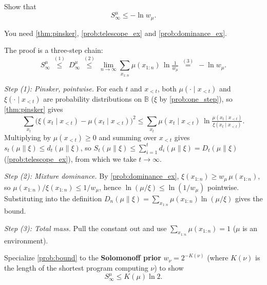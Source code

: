 \documentclass[fontsize=11pt, parskip=half]{scrartcl}
\begin{document}
\begin{exercise}
\label{prob:bound_ex}



Show that
\[
S_{\infty}^{\mu} \leq - \ln w_\mu.
\]

\begin{hint}
You need \cref{thm:pinsker}, \cref{prob:telescope_ex} and \cref{prob:dominance_ex}.
\end{hint}
\end{exercise}

\begin{solution}
The proof is a three-step chain:
\[
  S^\mu_\infty
  ~\stackrel{(1)}{\leq}~
   D^\mu_\infty
  ~\stackrel{(2)}{\leq}~
  \lim_{n \to \infty} \sum_{x_{1:n}} \mu(x_{1:n}) \,\ln \tfrac{1}{w_\mu}
  ~\stackrel{(3)}{=}~
  -\ln w_\mu.
\]

\medskip
\textit{Step (1): Pinsker, pointwise.}
For each $t$ and $x_{<t}$, both $\mu(\cdot \mid x_{<t})$ and $\xi(\cdot \mid x_{<t})$ are probability distributions on $\mathbb{B}$ ($\xi$ by \cref{prob:one_step}), so \cref{thm:pinsker} gives
\[
\sum_{x_t} \bigl(\xi(x_t \mid x_{<t}) - \mu(x_t \mid x_{<t})\bigr)^2 \leq \sum_{x_t} \mu(x_t \mid x_{<t}) \,\ln \tfrac{\mu(x_t \mid x_{<t})}{\xi(x_t \mid x_{<t})}.
\]
Multiplying by $\mu(x_{<t}) \geq 0$ and summing over $x_{<t}$ gives 
$s_t(\mu \parallel \xi) \leq d_t(\mu \parallel \xi)$, so $S_t(\mu \parallel \xi) \leq \sum_{i=1}^t d_i(\mu \parallel \xi) = D_t(\mu \parallel \xi)$ (\cref{prob:telescope_ex}), 
from which we take $t \to \infty$.


\medskip
\textit{Step (2): Mixture dominance.}
By \cref{prob:dominance_ex}, $\xi(x_{1:n}) \geq w_\mu\, \mu(x_{1:n})$, so $\mu(x_{1:n}) / \xi(x_{1:n}) \leq 1/w_\mu$, hence $\ln(\mu/\xi) \leq \ln(1/w_\mu)$ pointwise. Substituting into the definition $D_n(\mu \parallel \xi) = \sum_{x_{1:n}} \mu(x_{1:n}) \ln(\mu/\xi)$ gives the bound.

\medskip
\textit{Step (3): Total mass.}
Pull the constant out and use $\sum_{x_{1:n}} \mu(x_{1:n}) = 1$ ($\mu$ is an environment). \qedhere
\end{solution}


\begin{exercise}
\label{prob:bound_explicit_ex}



Specialize \cref{prob:bound} to the \textbf{Solomonoff prior} $w_\nu = 2^{-K(\nu)}$ (where $K(\nu)$ is the length of the shortest program computing $\nu$) to show
\[
S_{\infty}^{\mu} \leq K(\mu) \ln 2.
\]
\end{exercise}
\end{document}
